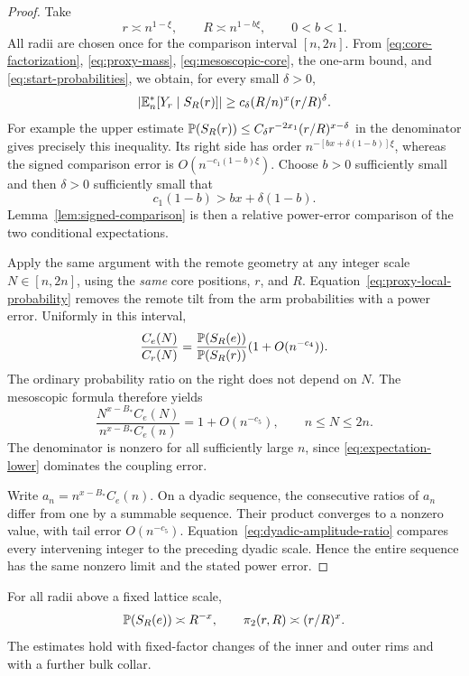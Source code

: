 \begin{proof}
Take
\[
 r\asymp n^{1-\xi},\qquad R\asymp n^{1-b\xi},
 \qquad 0<b<1.
\]
All radii are chosen once for the comparison interval $[n,2n]$.
From \eqref{eq:core-factorization}, \eqref{eq:proxy-mass},
\eqref{eq:mesoscopic-core}, the one-arm bound, and
\eqref{eq:start-probabilities}, we obtain, for every small
$\delta>0$,
\begin{equation}\label{eq:expectation-lower}
 \left|\mathbb E_n^*[Y_r\mid S_R(r)]\right|
 \ge c_\delta(R/n)^x(r/R)^\delta.
\end{equation}
For example the upper estimate
$\mathbb P(S_R(r))\le C_\delta r^{-2x_1}(r/R)^{x-\delta}$
in the denominator gives precisely this inequality.
Its right side has order
$n^{-[bx+\delta(1-b)]\xi}$, whereas the signed comparison error
is $O(n^{-c_1(1-b)\xi})$. Choose $b>0$ sufficiently small and then
$\delta>0$ sufficiently small that
\[
 c_1(1-b)>bx+\delta(1-b).
\]
Lemma~\ref{lem:signed-comparison} is then a relative power-error
comparison of the two conditional expectations.

Apply the same argument with the remote geometry at any integer scale
$N\in[n,2n]$, using the \emph{same} core positions, $r$, and $R$.
Equation~\eqref{eq:proxy-local-probability} removes the remote tilt
from the arm probabilities with a power error. Uniformly in this
interval,
\begin{equation}\label{eq:fixed-radii-ratio}
 \frac{C_e(N)}{C_r(N)}
 =\frac{\mathbb P(S_R(e))}{\mathbb P(S_R(r))}(1+O(n^{-c_4})).
\end{equation}
The ordinary probability ratio on the right does not depend on $N$.
The mesoscopic formula therefore yields
\begin{equation}\label{eq:dyadic-amplitude-ratio}
 \frac{N^{x-B_*}C_e(N)}{n^{x-B_*}C_e(n)}
 =1+O(n^{-c_5}),\qquad n\le N\le2n.
\end{equation}
The denominator is nonzero for all sufficiently large $n$, since
\eqref{eq:expectation-lower} dominates the coupling error.

Write $a_n=n^{x-B_*}C_e(n)$. On a dyadic sequence, the consecutive
ratios of $a_n$ differ from one by a summable sequence. Their product
converges to a nonzero value, with tail error $O(n^{-c_5})$.
Equation~\eqref{eq:dyadic-amplitude-ratio} compares every intervening
integer to the preceding dyadic scale. Hence the entire sequence has
the same nonzero limit and the stated power error.
\end{proof}

\begin{proposition}\label{prop:sharp-arms}
For all radii above a fixed lattice scale,
\begin{equation}\label{eq:sharp-arms}
 \mathbb P(S_R(e))\asymp R^{-x},\qquad
 \pi_2(r,R)\asymp(r/R)^x.
\end{equation}
The estimates hold with fixed-factor changes of the inner and outer
rims and with a further bulk collar.
\end{proposition}

